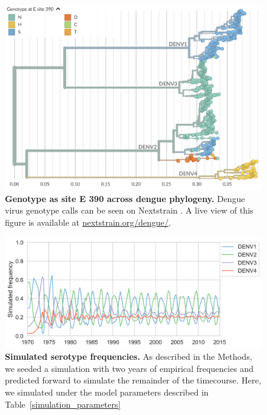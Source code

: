 \documentclass[11pt,oneside,letterpaper]{article}
\begin{document}
\begin{figure}[ht]
  \centering
  \includegraphics[width=\textwidth]{../figures/png/phylogeny_homoplasy.png}
  \caption{\textbf{Genotype as site E 390 across dengue phylogeny.}
  Dengue virus genotype calls can be seen on Nextstrain \citep{hadfield2018nextstrain}.
  A live view of this figure is available at \href{https://nextstrain.org/dengue/}{nextstrain.org/dengue/}.}
\label{phylogeny_homoplasy}
\end{figure}

\begin{figure}[ht]
  \centering
  \includegraphics[width=\textwidth]{../figures/png/simulated_frequencies_high_beta.png}
  \caption{\textbf{Simulated serotype frequencies.}
  As described in the Methods, we seeded a simulation with two years of empirical frequencies and predicted forward to simulate the remainder of the timecourse.
  Here, we simulated under the model parameters described in Table~\ref{simulation_parameters}}
\label{simulation_parameter_recovery}
\end{figure}
\end{document}
